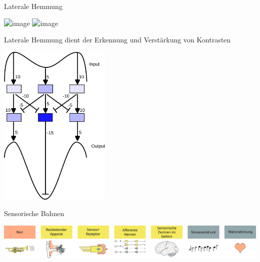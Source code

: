 \documentclass[aspectratio=169]{beamer}
\begin{document}
\begin{frame}{Laterale Hemmung}

\begin{center}

    \includegraphics<1>[width=\textwidth]{lateral_inhibition_funkction_1.png}
        \includegraphics<2>[width=\textwidth]{lateral_inhibition_funkction_2.png}
\end{center}

\end{frame}


\begin{frame}{Laterale Hemmung dient der Erkennung und Verstärkung von Kontrasten }

\begin{center}
    \includegraphics[width=0.4\textwidth]{laterale_hemmung.png}
\end{center}


\end{frame}

\begin{frame}{Sensorische Bahnen}
\begin{center}
    \includegraphics[width=\textwidth]{wahrnehmungsprozess.png}
\end{center}
    
\end{frame}



\end{document}

